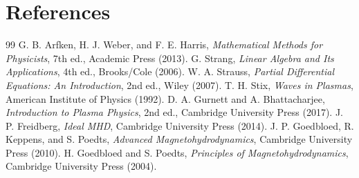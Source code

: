 \documentclass[11pt]{article}
\begin{document}
\section{References}
\begin{thebibliography}{99}
 G. B. Arfken, H. J. Weber, and F. E. Harris, \emph{Mathematical Methods for Physicists}, 7th ed., Academic Press (2013).
 G. Strang, \emph{Linear Algebra and Its Applications}, 4th ed., Brooks/Cole (2006).
 W. A. Strauss, \emph{Partial Differential Equations: An Introduction}, 2nd ed., Wiley (2007).
 T. H. Stix, \emph{Waves in Plasmas}, American Institute of Physics (1992).
 D. A. Gurnett and A. Bhattacharjee, \emph{Introduction to Plasma Physics}, 2nd ed., Cambridge University Press (2017).
 J. P. Freidberg, \emph{Ideal MHD}, Cambridge University Press (2014).
 J. P. Goedbloed, R. Keppens, and S. Poedts, \emph{Advanced Magnetohydrodynamics}, Cambridge University Press (2010).
 H. Goedbloed and S. Poedts, \emph{Principles of Magnetohydrodynamics}, Cambridge University Press (2004).
\end{thebibliography}
\end{document}
